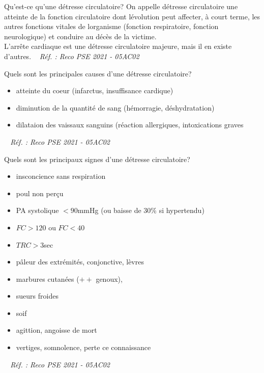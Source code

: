 \documentclass[grid,avery5371,landscape]{flashcards}
\makeatletter
\newcounter{nocarte}
\newcommand{\categ}[1]{%
  \def\@categ{#1}%
  \setcounter{nocarte}{0}%
}
\newcommand{\source}[1]{%
  \medskip
  \itshape%
   ~ \hfill Réf. : #1}
\makeatother
\begin{document}
\color[HTML]{003273}
\categ{PSE}
\begin{flashcard}[bilan]{
 Qu'est-ce qu'une détresse circulatoire?   }
  On appelle détresse circulatoire une atteinte de la fonction circulatoire dont lévolution peut affecter, à court terme, les autres fonctions vitales de lorganisme (fonction respiratoire, fonction neurologique) et conduire au décès de la victime. \\ L'arrête cardiaque est une détresse circulatoire majeure, mais il en existe d'autres.
  \source{Reco PSE 2021 - 05AC02}
\end{flashcard}


\color[HTML]{003273}
\categ{PSE}
\begin{flashcard}[bilan]{
 Quels sont les principales causes d'une détresse circulatoire?   }
  \begin{itemize} \item atteinte du coeur (infarctus, insuffisance cardique) \item diminution de la quantité de sang (hémorragie, déshydratation) \item dilataion des vaissaux sanguins (réaction allergiques, intoxications graves \end{itemize}
  \source{Reco PSE 2021 - 05AC02}
\end{flashcard}


\color[HTML]{003273}
\categ{PSE}
\begin{flashcard}[bilan]{
 Quels sont les principaux signes d'une détresse circulatoire?   }
  \begin{itemize} \item insconcience sans respiration \item poul non perçu \item PA systolique $< 90$mmHg (ou baisse de 30\% si hypertendu) \item $FC>120$ ou $FC<40$ \item $TRC > 3$sec \item pâleur des extrémités, conjonctive, lèvres \item marbures cutanées ($++$ genoux), \item sueurs froides \item soif \item agittion, angoisse de mort \item vertiges, somnolence, perte ce connaissance \end{itemize}
  \source{Reco PSE 2021 - 05AC02}
\end{flashcard}
\end{document}
